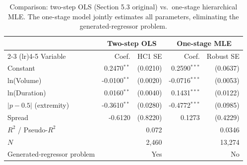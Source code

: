 \begin{table}[H]
\centering
\small
\caption{Comparison: two-step OLS (Section 5.3 original) vs.\ one-stage hierarchical MLE. The one-stage model jointly estimates all parameters, eliminating the generated-regressor problem.}
\label{tab:twostep_vs_onestage}
\begin{tabular}{lrrrr}
\toprule
 & \multicolumn{2}{c}{Two-step OLS} & \multicolumn{2}{c}{One-stage MLE} \\
\cmidrule(lr){2-3} \cmidrule(lr){4-5}
Variable & Coef. & HC1 SE & Coef. & Robust SE \\
\midrule
Constant & 0.2470$^{**}$ & (0.0210) & 0.2590$^{***}$ & (0.0637) \\
ln(Volume) & -0.0100$^{**}$ & (0.0020) & -0.0716$^{***}$ & (0.0053) \\
ln(Duration) & 0.0160$^{**}$ & (0.0040) & 0.1431$^{***}$ & (0.0122) \\
$|p - 0.5|$ (extremity) & -0.3610$^{**}$ & (0.0280) & -0.4772$^{***}$ & (0.0985) \\
Spread & -0.6120 & (0.8220) & 0.1273 & (0.4229) \\
\midrule
$R^2$ / Pseudo-$R^2$ & \multicolumn{2}{r}{0.072} & \multicolumn{2}{r}{0.0346} \\
$N$ & \multicolumn{2}{r}{2,460} & \multicolumn{2}{r}{13,274} \\
Generated-regressor problem & \multicolumn{2}{r}{Yes} & \multicolumn{2}{r}{No} \\
\bottomrule
\end{tabular}
\end{table}